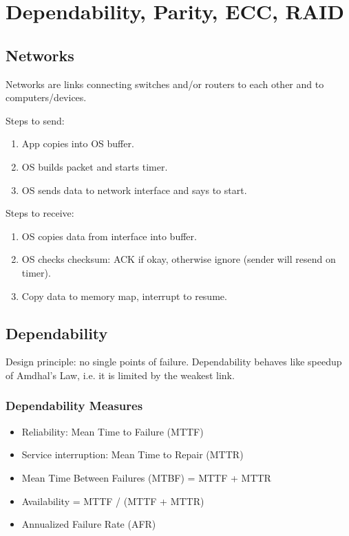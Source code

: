 \chapter{Dependability, Parity, ECC, RAID}

\section{Networks}
Networks are links connecting switches and/or routers to each other and to computers/devices.

\medskip

Steps to send:
\begin{enumerate}
	\item App copies into OS buffer.
	\item OS builds packet and starts timer.
	\item OS sends data to network interface and says to start.
\end{enumerate}

Steps to receive:
\begin{enumerate}
	\item OS copies data from interface into buffer.
	\item OS checks checksum: ACK if okay, otherwise ignore (sender will resend on timer).
	\item Copy data to memory map, interrupt to resume.
\end{enumerate}

\section{Dependability}
Design principle: no single points of failure. Dependability behaves like speedup of Amdhal's Law, i.e. it is limited by the weakest link.

\subsection{Dependability Measures}
\begin{itemize}
    \item Reliability: Mean Time to Failure (MTTF)
    \item Service interruption: Mean Time to Repair (MTTR)
    \item Mean Time Between Failures (MTBF) = MTTF + MTTR
    \item Availability = MTTF / (MTTF + MTTR)
    \item Annualized Failure Rate (AFR)
\end{itemize}

